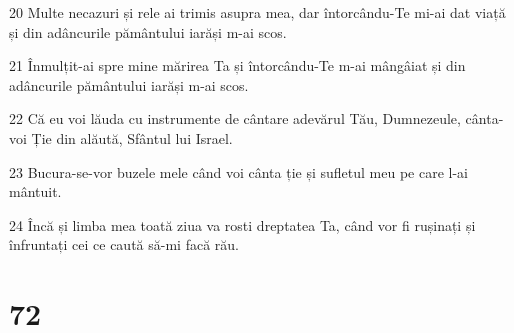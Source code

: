 \par 20 Multe necazuri și rele ai trimis asupra mea, dar întorcându-Te mi-ai dat viață și din adâncurile pământului iarăși m-ai scos.
\par 21 Înmulțit-ai spre mine mărirea Ta și întorcându-Te m-ai mângâiat și din adâncurile pământului iarăși m-ai scos.
\par 22 Că eu voi lăuda cu instrumente de cântare adevărul Tău, Dumnezeule, cânta-voi Ție din alăută, Sfântul lui Israel.
\par 23 Bucura-se-vor buzele mele când voi cânta ție și sufletul meu pe care l-ai mântuit.
\par 24 Încă și limba mea toată ziua va rosti dreptatea Ta, când vor fi rușinați și înfruntați cei ce caută să-mi facă rău.

\chapter{72}

